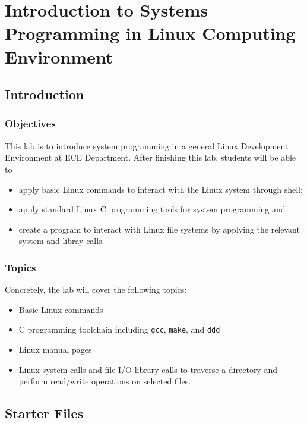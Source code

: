 \chapter{Introduction to Systems Programming in Linux Computing Environment}
\section{Introduction}
\subsection{Objectives}
This lab is to introduce system programming in a general Linux Development Environment at ECE Department. After finishing this lab, students will be able to
\begin{itemize}
   \item apply basic Linux commands to interact with the Linux system through shell;
   \item apply standard Linux C programming tools for system programming and
   \item create a program to interact with Linux file systems by applying the relevant system and libray calls.
\end{itemize}

\subsection{Topics}
Concretely, the lab will cover the following topics:
\begin{itemize}
  \item Basic Linux commands
  \item C programming toolchain including \verb+gcc+, \verb+make+, and \verb+ddd+
  \item Linux manual pages
  \item Linux system calls and file I/O library calls to traverse a directory and perform read/write operations on selected files.
  \end{itemize}
  
\section{Starter Files}

